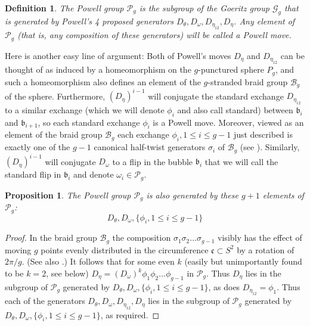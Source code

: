 \documentclass[12pt]{amsart}
\newtheorem{defin}[thm]{Definition}
\newtheorem{prop}[thm]{Proposition}
\newcommand{\calB}{\mathcal B}
\newcommand{\calG}{\mathcal G}
\newcommand{\calP}{\mathcal P}
\newcommand{\frb}{\mathfrak{b}}
\newcommand{\frc}{\mbox{$\mathfrak{c}$}}
\begin{document}
\begin{defin} %
The Powell group $\calP_g$ is the subgroup of the Goeritz group $\calG_g$ that is generated by Powell's 4 proposed generators $D_{\theta}, D_{\omega}, D_{\eta_{12}}, D_{\eta}$.  Any element of $\calP_g$ (that is, any composition of these generators) will be called a {\em Powell move}.  
\end{defin}

Here is another easy line of argument:  Both of Powell's moves $D_{\eta}$ and $D_{\eta_{12}}$ can be thought of as induced by a homeomorphism on the $g$-punctured sphere $P_g$, and such a homeomorphism also defines an element of the $g$-stranded braid group $\calB_g$ of the sphere.  Furthermore, $(D_{\eta})^{i-1}$ will conjugate the standard exchange $D_{\eta_{12}}$ to a similar exchange (which we will denote $\phi_i$ and also call standard) between $\frb_i$ and $\frb_{i+1}$, so each standard exchange $\phi_i$ is a Powell move.  Moreover, viewed as an element of the braid group $\calB_g$ each exchange $\phi_i, 1 \leq i \leq g-1$ just described is exactly one of the $g-1$ canonical half-twist generators $\sigma_i$ of $\calB_g$ (see \cite[Chapter 9]{FM}). 
Similarly, $(D_{\eta})^{i-1}$ will conjugate $D_{\omega}$ to a flip in the bubble $\frb_i$ that we will call the standard flip in $\frb_i$ and denote $\omega_i \in \calP_g$.  

\begin{prop} \label{prop:newgen}  %
The Powell group $\calP_g$ is also generated by these $g+1$ elements of $\calP_g$: \[D_{\theta}, D_{\omega}, \{\phi_i, 1 \leq i \leq g-1\}\]
\end{prop}
\begin{proof}  In the braid group $\calB_g$ the composition $\sigma_1 \sigma_2 ... \sigma_{g-1}$ visibly has the effect of moving $g$ points evenly distributed in the circumference $\frc \subset S^2$ by a rotation of $2\pi/g$.  (See also \cite[Chapter 9]{FM}.)  It follows that for some even $k$ (easily but unimportantly found to be $k = 2$, see below) $D_{\eta} = (D_{\omega})^k \phi_1 \phi_2 ... \phi_{g-1}$ in $\calP_g$.  Thus $D_{\eta}$ lies in the subgroup of $\calP_g$ generated by $D_{\theta}, D_{\omega}, \{\phi_i, 1 \leq i \leq g-1\}$, as does $D_{\eta_{12}} = \phi_1$.  Thus each of the generators $D_{\theta}, D_{\omega}, D_{\eta_{12}}, D_{\eta}$ lies in the subgroup of $\calP_g$ generated by $D_{\theta}, D_{\omega}, \{\phi_i, 1 \leq i \leq g-1\}$, as required.
\end{proof}
\end{document}
